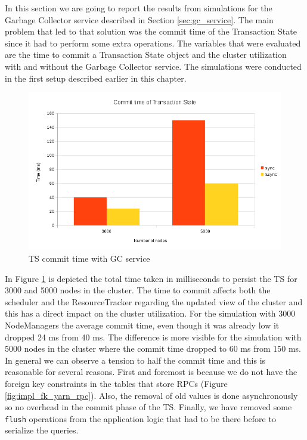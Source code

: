 In this section we are going to report the results from simulations
for the Garbage Collector service described in Section
\ref{sec:gc_service}. The main problem that led to that solution was
the commit time of the Transaction State since it had to perform some
extra operations. The variables that were evaluated are the time to
commit a Transaction State object and the cluster utilization with and
without the Garbage Collector service. The simulations were conducted
in the first setup described earlier in this chapter.

\begin{figure}
\centering
\includegraphics[scale=0.7]{resources/images/Evaluation/ts_commit_sync_async.png}
\caption{TS commit time with GC service}
\label{fig:ev_ts_sync_async}
\end{figure}

In Figure \ref{fig:ev_ts_sync_async} is depicted the total time taken
in milliseconds to persist the TS for 3000 and 5000 nodes in the
cluster. The time to commit affects both the scheduler and the
ResourceTracker regarding the updated view of the cluster and this has
a direct impact on the cluster utilization. For the simulation with
3000 NodeManagers the average commit time, even though it was already
low it dropped 24 ms from 40 ms. The difference is more visible
for the simulation with 5000 nodes in the cluster where the commit
time dropped to 60 ms from 150 ms. In general we can observe a tension
to half the commit time and this is reasonable for several
reasons. First and foremost is because we do not have the foreign key
constraints in the tables that store RPCs (Figure
\ref{fig:impl_fk_yarn_rpc}). Also, the removal of old values is done
asynchronously so no overhead in the commit phase of the TS. Finally,
we have removed some \texttt{flush} operations from the application
logic that had to be there before to serialize the queries.


